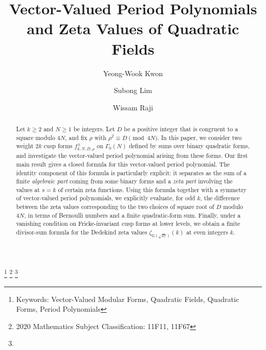 \documentclass[12pt]{amsart}
\numberwithin{equation}{section}
\theoremstyle{definition}
\begin{document}
	
\newcommand{\pr}{\partial}
\newcommand{\nl}{\vskip 1pc}
\newcommand{\co}{\mbox{co}}
\newcommand{\ol}{\overline}
\newcommand{\om}{\Omega}
\newcommand{\ra}{\rightarrow}
\newcommand{\epsil}{\varepsilon}
\makeatletter
\newcommand*{\rom}[1]{\expandafter\@slowromancap\romannumeral #1@}
\newcommand{\powerset}{\raisebox{.15\baselineskip}{\Large\ensuremath{\wp}}}
\newcommand{\upperRomannumeral}[1]{\setcounter{counter}{#1}\Roman{counter}}
\newcommand{\lowerromannumeral}[1]{\setcounter{counter}{#1}\roman{counter}}
\newcommand*\circled[1]{\tikz[baseline=(char.base)]{
		\node[shape=circle,draw,inner sep=1pt] (char) {#1};}}
\makeatother
\title{Vector-Valued Period Polynomials and Zeta Values of Quadratic Fields}

\author{Yeong-Wook Kwon}

\author{Subong Lim}

\author{Wissam Raji}

\address{Institute of Basic Science, Korea University, 145 Anam-ro, Seongbuk-gu, Seoul, 02841, Republic of Korea}

\address{Department of Mathematics Education, Sungkyunkwan University, Jongno-gu, Seoul 110-745, Republic of Korea}

\address{Department of Mathematics, American University of Beirut (AUB) and the Number Theory Research Unit at the Center for Advanced Mathematical Sciences (CAMS) at AUB, Beirut, Lebanon}



 \thanks{Keywords: Vector-Valued Modular Forms, Quadratic Fields, Quadratic Forms, Period Polynomials}
  \thanks{2020
 Mathematics Subject Classification: 11F11, 11F67}
  \thanks{}
  
\begin{abstract}
Let $k\ge 2$ and $N\ge 1$ be integers. Let $D$ be a positive integer that is congruent to a square modulo $4N$, and fix $\rho$ with $\rho^2\equiv D\pmod{4N}$.
In this paper, we consider two weight $2k$ cusp forms $f^{\pm}_{k,N,D,\rho}$ on $\Gamma_0(N)$ defined by sums over binary quadratic forms, and investigate the vector-valued period polynomial arising from these forms.
Our first main result gives a closed formula for this vector-valued period polynomial. The identity component of this formula is particularly explicit: it separates as the sum of a finite \textit{algebraic part} coming from some binary forms and a \textit{zeta part} involving the values at $s=k$ of certain zeta functions. 
Using this formula together with a symmetry of vector-valued period polynomials, we explicitly evaluate, for odd $k$, the difference between the zeta values corresponding to the two choices of square root of $D$ modulo $4N$, in terms of Bernoulli numbers and a finite quadratic-form sum.
Finally, under a vanishing condition on Fricke-invariant cusp forms at lower levels, we obtain a finite divisor-sum formula for the Dedekind zeta values $\zeta_{\mathbb{Q}(\sqrt{D})}(k)$ at even integers $k$.
\end{abstract}
\end{document}
